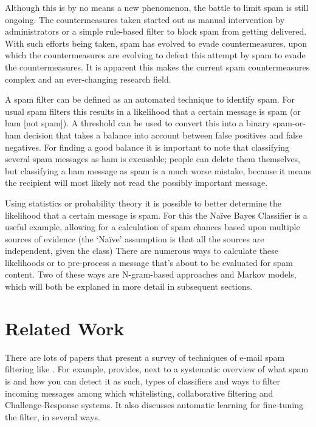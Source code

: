 \documentclass[runningheads,a4paper]{llncs}
\begin{document}
Although this is by no means a new phenomenon, the battle to limit spam is still ongoing. 
The countermeasures taken started out as manual intervention by administrators or a simple 
rule-based filter to block spam from getting delivered. With such efforts being taken, spam
has evolved to evade countermeasures\cite{2006survey}, upon which the countermeasures are evolving 
to defeat this attempt by spam to evade the countermeasures\cite{2007systematic}. It is apparent 
this makes the current spam countermeasures complex and an ever-changing research field.

A spam filter can be defined as an automated technique to identify spam. 
For usual spam filters this results in a likelihood that a certain message is 
spam (or ham [not spam]). A threshold can be used to convert this into a 
binary spam-or-ham decision that takes a balance into account between 
false positives and false negatives. For finding a good balance it is important
to note that classifying several spam messages as ham is excusable; people
can delete them themselves, but classifying a ham message as spam is a much
worse mistake, because it means the recipient will most likely not read the
possibly important message. 

Using statistics or probability theory it is possible to better determine the 
likelihood that a certain message is spam. For this the Na\"ive Bayes Classifier 
is a useful example, allowing for a calculation of spam chances based 
upon multiple sources of evidence (the `Na\"ive' assumption is that 
all the sources are independent, given the class)\cite{2005ngram} 
There are numerous ways to calculate these likelihoods or to pre-process 
a message that's about to be evaluated for spam content. Two of these ways 
are N-gram-based approaches and Markov models, which will both be 
explaned in more detail in subsequent sections.

\section{Related Work}
There are lots of papers that present a survey of techniques of e-mail spam 
filtering like \cite{2007systematic,2009elsevier}. For example, \cite{2007systematic} 
provides, next to a systematic overview of what spam is and how you can 
detect it as such, types of classifiers and ways to filter incoming messages 
among which whitelisting, collaborative filtering and Challenge-Response 
systems. It also discusses automatic learning for fine-tuning the filter, in 
several ways.
\end{document}
